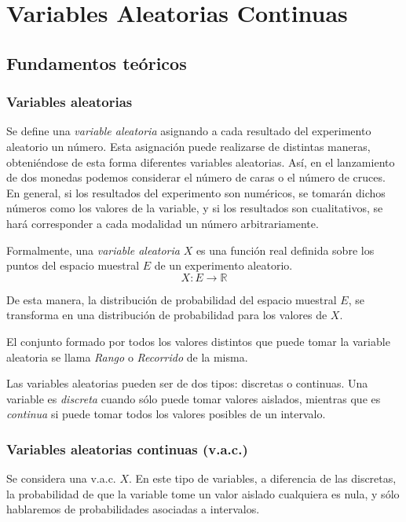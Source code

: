 
\chapter{Variables Aleatorias Continuas}

\section{Fundamentos teóricos}
\subsection{Variables aleatorias}
Se define una \emph{variable aleatoria} asignando a cada resultado del experimento aleatorio un número. Esta asignación puede realizarse de distintas maneras, obteniéndose de esta forma diferentes variables aleatorias. Así, en el lanzamiento de dos monedas podemos considerar el número de caras o el número de cruces. En general, si los resultados del experimento son numéricos, se tomarán dichos números como los valores de la variable, y si los resultados son cualitativos, se hará corresponder a cada modalidad un número arbitrariamente.

Formalmente, una \emph{variable aleatoria} $X$ es una función real
definida sobre los puntos del espacio muestral $E$ de un experimento
aleatorio. \[X:E\rightarrow \mathbb{R}\]

De esta manera, la distribución de probabilidad del espacio muestral
$E$, se transforma en una distribución de probabilidad para los
valores de $X$.

El conjunto formado por todos los valores distintos que puede tomar la variable aleatoria se llama \emph{Rango} o \emph{Recorrido} de la misma.

Las variables aleatorias pueden ser de dos tipos: discretas o continuas. Una variable es \emph{discreta} cuando sólo puede tomar valores aislados, mientras que es \emph{continua} si puede tomar todos los valores posibles de un intervalo.

\subsection{Variables aleatorias continuas (v.a.c.)}
Se considera una v.a.c. $X$. En este tipo de variables, a diferencia
de las discretas, la probabilidad de que la variable tome un valor
aislado cualquiera es nula, y sólo hablaremos de probabilidades
asociadas a intervalos.

